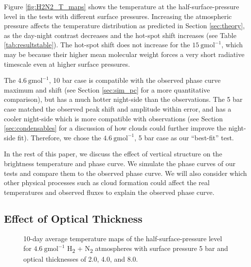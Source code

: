 Figure \ref{fig:H2N2_T_maps} shows the temperature at the half-surface-pressure level in the tests with different surface pressures. Increasing the atmospheric pressure affects the temperature distribution as predicted in Section \ref{sec:theory}, as the day-night contrast decreases and the hot-spot shift increases (see Table \ref{tab:resultstable}). The hot-spot shift does not increase for the $15\ \mathrm{gmol}^{-1}$, which may be because their higher mean molecular weight forces a very short radiative timescale even at higher surface pressures.

The $4.6\ \mathrm{gmol}^{-1}$, 10 bar case is compatible with the observed phase curve maximum and shift (see Section \ref{sec:sim_pc} for a more quantitative comparison), but has a much hotter night-side than the observations. The 5 bar case matched the observed peak shift and amplitude within error, and has a cooler night-side which is more compatible with observations (see Section \ref{sec:condensables} for a discussion of how clouds could further improve the night-side fit). Therefore, we chose the $4.6\ \mathrm{gmol}^{-1}$, 5 bar case as our ``best-fit'' test.

In the rest of this paper, we discuss the effect of vertical structure on the brightness temperature and phase curve. We simulate the phase curves of our tests and compare them to the observed phase curve. We will also consider which other physical processes such as cloud formation could affect the real temperatures and observed fluxes to explain the observed phase curve.


\subsection{Effect of Optical Thickness}\label{sec:tauinf_effect}


\begin{figure}[t]

\caption{10-day average temperature maps of the half-surface-pressure level for $4.6\ \mathrm{gmol}^{-1}$  H\textsubscript{2} + N\textsubscript{2} atmospheres with surface pressure 5 bar and optical thicknesses of 2.0, 4.0, and 8.0.\label{fig:vary_tau_maps}}
\end{figure}

